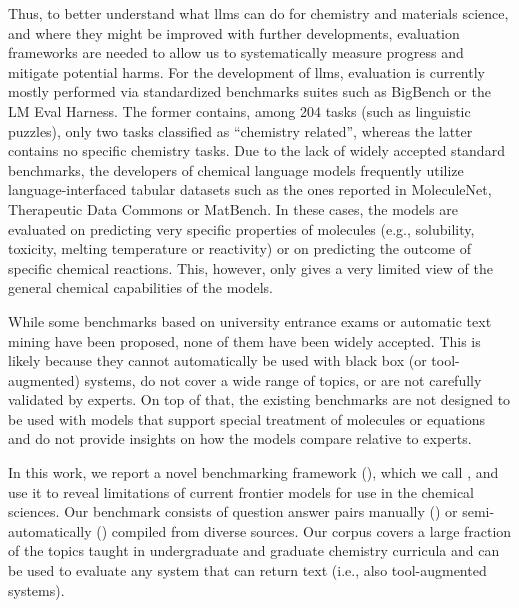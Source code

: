 \documentclass[11pt, oneside]{article}
\begin{document}
\begin{refsection}
Thus, to better understand what \glspl{llm} can do for chemistry and materials science, and where they might be improved with further developments, evaluation frameworks are needed to allow us to systematically measure progress and mitigate potential harms.
For the development of \glspl{llm}, evaluation is currently mostly performed via standardized benchmarks suites such as BigBench\autocite{srivastava2022beyond} or the LM Eval Harness.\autocite{eval-harness}
The former contains, among 204 tasks (such as linguistic puzzles), only two tasks classified as \enquote{chemistry related}, whereas the latter contains no specific chemistry tasks.
Due to the lack of widely accepted standard benchmarks, the developers of chemical language models\autocite{jablonka2024leveraging, guo2023large, ahmad2022chemberta2, Cai_2024, frey2023neural} frequently utilize language-interfaced\autocite{dinh2022lift} tabular datasets such as the ones reported in MoleculeNet,\autocite{wu2018moleculenet} Therapeutic Data Commons\autocite{huang2021therapeutics} or MatBench.\autocite{dunn2020benchmarking}
In these cases, the models are  evaluated on predicting very specific properties of molecules (e.g., solubility, toxicity, melting temperature or reactivity) or on predicting the outcome of specific chemical reactions.
This, however, only gives a very limited view of the general chemical capabilities of the models.

While some benchmarks based on university entrance exams\autocite{Zaki_2024, arora2023llms} or automatic text mining\autocite{song2023honeybee, wei2021chemistryqa} have been proposed, none of them have been widely accepted.
This is likely because they cannot automatically be used with black box (or tool-augmented) systems, do not cover a wide range of topics, or are not carefully validated by experts.
On top of that, the existing benchmarks are not designed to be used with models that support special treatment of molecules or equations and do not provide insights on how the models compare relative to experts.

In this work, we report a novel benchmarking framework  (), which we call \chembench, and use it to reveal limitations of current frontier models for use in the chemical sciences.
Our benchmark consists of \xspace question answer pairs manually (\unskip) or semi-automatically (\unskip) compiled from diverse sources.
Our corpus covers a large fraction of the topics taught in undergraduate and graduate chemistry curricula and can be used to evaluate any system that can return text (i.e., also tool-augmented systems).


\end{refsection}
\end{document}
